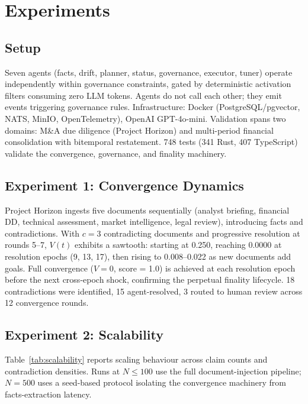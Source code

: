 \documentclass[11pt]{article}
\begin{document}
\section{Experiments}
\label{sec:experiments}

\subsection{Setup}

Seven agents (facts, drift, planner, status, governance, executor, tuner) operate independently within governance constraints, gated by deterministic activation filters consuming zero LLM tokens.
Agents do not call each other; they emit events triggering governance rules.
Infrastructure: Docker (PostgreSQL/pgvector, NATS, MinIO, OpenTelemetry), OpenAI GPT-4o-mini.
Validation spans two domains: M\&A due diligence (Project Horizon) and multi-period financial consolidation with bitemporal restatement.
748 tests (341 Rust, 407 TypeScript) validate the convergence, governance, and finality machinery.

\subsection{Experiment 1: Convergence Dynamics}

Project Horizon ingests five documents sequentially (analyst briefing, financial DD, technical assessment, market intelligence, legal review), introducing facts and contradictions.
With $c = 3$ contradicting documents and progressive resolution at rounds 5--7, $V(t)$ exhibits a sawtooth: starting at 0.250, reaching 0.0000 at resolution epochs (9, 13, 17), then rising to 0.008--0.022 as new documents add goals.
Full convergence ($V = 0$, score = 1.0) is achieved at each resolution epoch before the next cross-epoch shock, confirming the perpetual finality lifecycle.
18 contradictions were identified, 15 agent-resolved, 3 routed to human review across 12 convergence rounds.

\subsection{Experiment 2: Scalability}

Table~\ref{tab:scalability} reports scaling behaviour across claim counts and contradiction densities.
Runs at $N \leq 100$ use the full document-injection pipeline; $N = 500$ uses a seed-based protocol isolating the convergence machinery from facts-extraction latency.
\end{document}
